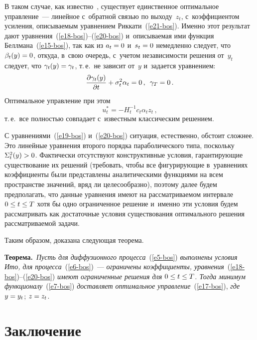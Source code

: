 \begin{multicols}{2}
     В таком случае, как известно~\cite{10-bos}, существует единственное 
оптимальное управление~--- линейное с~обратной связью по выходу~$z_t$, 
с~коэффициентом усиления, опи\-сы\-ва\-емым уравнением  
Риккати~(\ref{e21-bos}). Именно этот результат дают  
уравнения~(\ref{e18-bos})--(\ref{e20-bos}) и~описываемая ими функция 
Беллмана~(\ref{e15-bos}), так как из $a_t\hm=0$ и~$s_t\hm=0$ немедленно 
следует, что $\beta_t(y)\hm=0$, откуда, в~свою очередь, с~учетом 
не\-за\-ви\-си\-мости решения от~$y_t$ следует, что $\gamma_t(y)\hm=\gamma_t$, 
т.\,е.\ не зависит от~$y$ и~задается уравнением: 
     $$
     \displaystyle\frac{\displaystyle \partial \gamma_t(y)\mathstrut}{\displaystyle \partial t\mathstrut} +\sigma^2_t \alpha_t=0\,,\enskip 
\gamma_T=0\,.
     $$ 
     Оптимальное управ\-ле\-ние при этом 
     $$
     u_t^*= -H_t^{-1} c_t \alpha_t z_t\,,
     $$
      т.\,е.\ все полностью совпадает с~известным классическим решением.
     
     С уравнениями~(\ref{e19-bos}) и~(\ref{e20-bos}) ситуация, естественно, 
обстоит сложнее. Это линейные уравнения второго порядка параболического 
типа, поскольку\linebreak
 $\Sigma_t^2(y)\hm>0$. Фактически отсутствуют 
конструктивные условия, гарантирующие существование их\linebreak
 решений 
(требовать, чтобы все фигурирующие в~уравнениях коэффициенты были 
представлены аналитическими функциями на всем пространстве значений, 
вряд ли целесообразно), поэтому далее будем предполагать, что данные 
уравнения имеют на рас\-смат\-ри\-ва\-емом интервале $0\hm\leq t\hm\leq T$ хотя 
бы одно ограниченное решение и~именно эти условия будем рас\-смат\-ри\-вать 
как достаточные условия существования оптимального решения 
рассматриваемой задачи.
     
     Таким образом, доказана следующая тео\-рема.
     
     \smallskip
     
     \noindent
     \textbf{Теорема.}\ \textit{Пусть для диффузионного 
процесса}~(\ref{e5-bos}) \textit{выполнены условия Ито, для 
     процесса}~(\ref{e6-bos})~--- \textit{ограничены коэффициенты, 
уравнения}~(\ref{e18-bos})--(\ref{e20-bos}) \textit{имеют ограниченные 
решения для $0\hm\leq t\hm\leq T$. Тогда минимум  
функционалу}~(\ref{e7-bos}) \textit{доставляет оптимальное 
управ\-ле\-ние}~(\ref{e17-bos}), \textit{где} $y\hm= y_t$; $z\hm=z_t$.
     
\section{Заключение}


\end{multicols}
